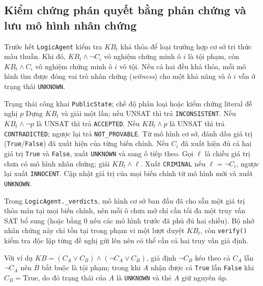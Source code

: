\clearpage

\subsection{Kiểm chứng phán quyết bằng phản chứng và lưu mô hình nhân chứng}

Trước hết \texttt{LogicAgent} kiểm tra $KB_t$ khả thỏa để loại trường hợp cơ sở tri thức mâu thuẫn. Khi đó, $KB_t\land\neg C_i$ vô nghiệm chứng minh ô $i$ là tội phạm, còn $KB_t\land C_i$ vô nghiệm chứng minh ô $i$ vô tội. Nếu cả hai đều khả thỏa, mỗi mô hình tìm được đóng vai trò nhân chứng (\textit{witness}) cho một khả năng và ô $i$ vẫn ở trạng thái \texttt{UNKNOWN}.

\begin{algorithm}[H]
\small\singlespacing
\caption{Phân loại các ô chưa mở và kiểm chứng đề nghị}
\begin{algorithmic}[1]
\Require Trạng thái công khai \texttt{PublicState}; chế độ phân loại hoặc kiểm chứng literal đề nghị $p$
\State Dựng $KB_t$ và giải một lần; nếu UNSAT thì trả \texttt{INCONSISTENT}.
\State Nếu $KB_t\land\neg p$ là UNSAT thì trả \texttt{ACCEPTED}.
\State Nếu $KB_t\land p$ là UNSAT thì trả \texttt{CONTRADICTED}; ngược lại trả \texttt{NOT\_PROVABLE}.
\EndIf
\State Từ mô hình cơ sở, đánh dấu giá trị (\texttt{True}/\texttt{False}) đã xuất hiện của từng biến chính.
\State Nếu $C_i$ đã xuất hiện đủ cả hai giá trị \texttt{True} và \texttt{False}, xuất \texttt{UNKNOWN} và sang ô tiếp theo.
\State Gọi $\ell$ là chiều giá trị chưa có mô hình nhân chứng; giải $KB_t\land\ell$.
\State Xuất \texttt{CRIMINAL} nếu $\ell=\neg C_i$, ngược lại xuất \texttt{INNOCENT}.
\Else
\State Cập nhật giá trị của mọi biến chính từ mô hình mới và xuất \texttt{UNKNOWN}.
\EndIf
\EndFor
\end{algorithmic}
\end{algorithm}

Trong \texttt{LogicAgent.\_verdicts}, mô hình cơ sở ban đầu đã cho sẵn một giá trị thỏa mãn tại mọi biến chính, nên mỗi ô chưa mở chỉ cần tối đa một truy vấn SAT bổ sung (hoặc bằng 0 nếu các mô hình trước đã phủ đủ hai chiều). Bộ nhớ nhân chứng này chỉ tồn tại trong phạm vi một lượt duyệt $KB_t$, còn \texttt{verify()} kiểm tra độc lập từng đề nghị gửi lên nên có thể cần cả hai truy vấn giả định.

Với ví dụ $KB=(C_A\lor C_B)\land(\neg C_A\lor C_B)$, giả định $\neg C_B$ kéo theo cả $C_A$ lẫn $\neg C_A$ nên $B$ bắt buộc là tội phạm; trong khi $A$ nhận được cả \texttt{True} lẫn \texttt{False} khi $C_B=\mathrm{True}$, do đó trạng thái của $A$ là \texttt{UNKNOWN} và thẻ $A$ giữ nguyên úp.

